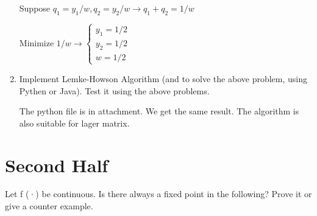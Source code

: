 \documentclass{article}
\newenvironment{answer}{\par\color{ForestGreen}}{\par}
\begin{document}
\begin{enumerate}
\begin{answer}
      Suppose $q_1 = y_1/w, q_2 = y_2 /w \rightarrow q_1 + q_2 = 1/w$

      Minimize $1/w \rightarrow
      \begin{cases}
        y_1 = 1/2 \\
        y_2 = 1/2 \\
        w = 1/2
     \end{cases}
      $

    \end{answer}

    \item
    Implement Lemke-Howson Algorithm (and to solve the above problem, using Pythen or Java). Test it using the above problems.

    \begin{answer}
      The python file is in attachment. We get the same result. The algorithm is also suitable for lager matrix.
    \end{answer}

\end{enumerate}

\section{Second Half}
Let f (·) be continuous. Is there always a fixed point in the following? Prove it or give a counter example.
\end{document}
